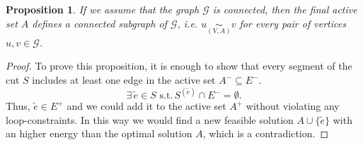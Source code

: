 \documentclass[12pt]{article}
\newcommand\TODO[1]{\fbox{\textcolor{red}{TODO: #1}}}
\newtheorem{prop}{Proposition}[section]
\begin{document}
\begin{prop} \label{prop:A_connected}
If we assume that the graph $\mathcal{G}$ is connected, then the final active set $A$ defines a connected subgraph of $\mathcal{G}$, i.e. $u \underset{(V,A)}{\sim}v$ for every pair of vertices $u,v \in \mathcal{G}$. 
\end{prop}
\begin{proof}
To prove this proposition, it is enough to show that every segment of the cut $S$ includes at least one edge in the active set $A^- \subseteq E^-$. 
\begin{equation}
\exists \, \tilde{e} \in S \,\, \mathrm{s.t.} \, S^{(\tilde{e})}\cap E^- = \emptyset.
\end{equation}
Thus, $\tilde{e}\in E^+$ and we could add it to the active set $A^+$ without violating any loop-constraints. In this way we would find a new feasible solution $A \cup \{\tilde{e}\}$ with an higher energy than the optimal solution $A$, which is a contradiction. \TODO{rewrite}
\end{proof}
\end{document}
